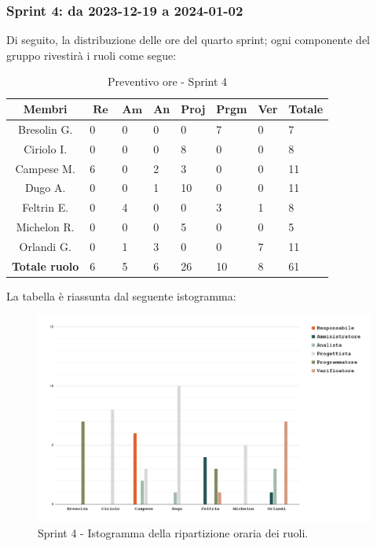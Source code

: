 \documentclass[10pt, a4paper]{article}
\begin{document}
{{{{{{{{{{{\subsubsection{Sprint 4: da 2023-12-19 a 2024-01-02}
Di seguito, la distribuzione delle ore del quarto sprint; ogni componente del gruppo rivestirà i ruoli come segue:
\begin{table}[H]
\begin{tabularx}{\textwidth}{c|X|X|X|X|X|X|X}
        \textbf{Membri} & $\operatorname{\textbf{Re}}$ & $\mathrm{\textbf{Am}}$ & \textbf{An} & \textbf{Proj} & \textbf{Prgm} & \textbf{Ver} & \textbf{Totale} \\
        \hline Bresolin G. & 0 & 0 & 0 & 0 & \cellcolor{primarycolor}7 & 0 & 7 \\
        \hline Ciriolo I.  & 0 & 0 & 0 & \cellcolor{primarycolor}8 & 0 & 0 & 8 \\
        \hline Campese M.  & \cellcolor{primarycolor}6 & 0 & 2 & 3 & 0 & 0 & 11 \\
        \hline Dugo A.     & 0 & 0 & 1 & \cellcolor{primarycolor}10 & 0 & 0 & 11 \\
        \hline Feltrin E.  & 0 & \cellcolor{primarycolor}4 & 0 & 0 & 3 & 1 & 8 \\
        \hline Michelon R. & 0 & 0 & 0 & \cellcolor{primarycolor}5 & 0 & 0 & 5 \\
        \hline Orlandi G.  & 0 & 1 & 3 & 0 & 0 & \cellcolor{primarycolor}7 & 11 \\
        \hline
        \textbf{Totale ruolo} & 6 & 5 & 6 & 26 & 10 & 8 & 61 
    \end{tabularx}
    \caption{Preventivo ore - Sprint 4}
    \end{table}

La tabella è riassunta dal seguente istogramma:
 \begin{figure}[H]
        \centering        
        \includegraphics[width=15.5cm]{istogrammi/istogramma_4_periodo.png}
        \caption{Sprint 4 - Istogramma della ripartizione oraria dei ruoli. }
    \end{figure}

}}}}}}}}}}}
\end{document}
